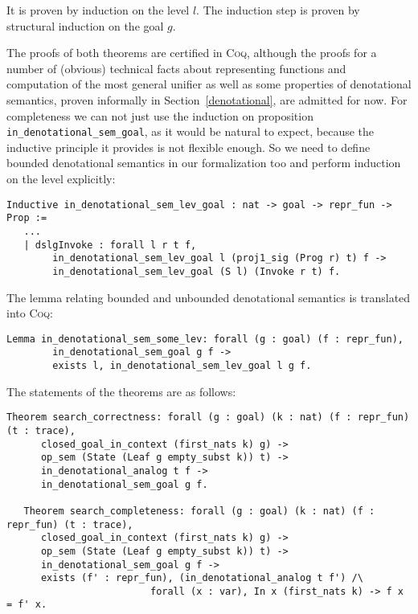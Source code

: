 It is proven by induction on the level $l$. The induction step is proven by structural induction on the goal $g$.

The proofs of both theorems are certified in \textsc{Coq}, although the proofs for a number of (obvious) technical facts about representing functions and computation of the most
general unifier as well as some properties of denotational semantics, proven informally in Section~\ref{denotational}, are
admitted for now. For completeness we can not just use the induction on proposition \lstinline|in_denotational_sem_goal|, as it would be natural to expect,
because the inductive principle it provides is not flexible enough. So we need to define bounded denotational semantics in our formalization too and perform
induction on the level explicitly:

\begin{lstlisting}[language=Coq]
   Inductive in_denotational_sem_lev_goal : nat -> goal -> repr_fun -> Prop :=
   ...
   | dslgInvoke : forall l r t f,
        in_denotational_sem_lev_goal l (proj1_sig (Prog r) t) f ->
        in_denotational_sem_lev_goal (S l) (Invoke r t) f.
\end{lstlisting}

The lemma relating bounded and unbounded denotational semantics is translated into \textsc{Coq}:

\begin{lstlisting}[language=Coq]
   Lemma in_denotational_sem_some_lev: forall (g : goal) (f : repr_fun),
        in_denotational_sem_goal g f ->
        exists l, in_denotational_sem_lev_goal l g f.
\end{lstlisting}

The statements of the theorems are as follows:

\begin{lstlisting}[language=Coq]
   Theorem search_correctness: forall (g : goal) (k : nat) (f : repr_fun) (t : trace),
      closed_goal_in_context (first_nats k) g) ->
      op_sem (State (Leaf g empty_subst k)) t) ->
      in_denotational_analog t f ->
      in_denotational_sem_goal g f.
      
   Theorem search_completeness: forall (g : goal) (k : nat) (f : repr_fun) (t : trace),
      closed_goal_in_context (first_nats k) g) ->
      op_sem (State (Leaf g empty_subst k)) t) ->
      in_denotational_sem_goal g f ->
      exists (f' : repr_fun), (in_denotational_analog t f') /\
                         forall (x : var), In x (first_nats k) -> f x = f' x.
\end{lstlisting}

